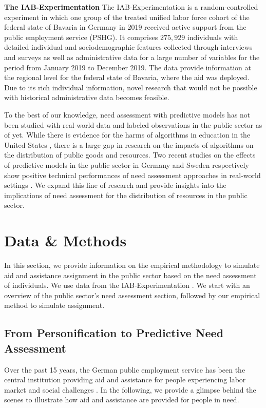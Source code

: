 \textbf{The IAB-Experimentation} The IAB-Experimentation \cite{10.1145/3588001.3609369} is a random-controlled experiment in which one group of the treated unified labor force cohort of the federal state of Bavaria in Germany in 2019 received active support from the public employment service (PSHG). It comprises $275{,}929$ individuals with detailed individual and sociodemographic features collected through interviews and surveys as well as administrative data for a large number of variables for the period from January 2019 to December 2019. The data provide information at the regional level for the federal state of Bavaria, where the aid was deployed. Due to its rich individual information, novel research that would not be possible with historical administrative data becomes feasible.

To the best of our knowledge, need assessment with predictive models has not been studied with real-world data and labeled observations in the public sector as of yet. While there is evidence for the harms of algorithms in education in the United States \cite{chouldechova2018case,desireUsingArtificialIntelligence2021}, there is a large gap in research on the impacts of algorithms on the distribution of public goods and resources. Two recent studies on the effects of predictive models in the public sector in Germany and Sweden respectively show positive technical performances of need assessment approaches in real-world settings \cite{FISCHERABAIGAR2024101976,sun2019mapping}. We expand this line of research and provide insights into the implications of need assessment for the distribution of resources in the public sector.




\section{Data \& Methods}

\label{sec:data}
In this section, we provide information on the empirical methodology to simulate aid and assistance assignment in the public sector based on the need assessment of individuals. We use data from the IAB-Experimentation \cite{athey2021policy}. We start with an overview of the public sector's need assessment section, followed by our empirical method to simulate assignment.

\subsection{From Personification to Predictive Need Assessment}
Over the past 15 years, the German public employment service has been the central institution providing aid and assistance for people experiencing labor market and social challenges \cite{Kallus03042021, wirtz2019artificial}. In the following, we provide a glimpse behind the scenes to illustrate how aid and assistance are provided for people in need.

